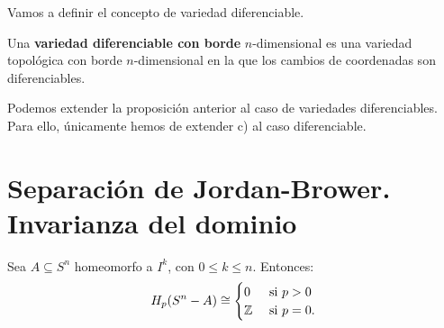 Vamos a definir el concepto de variedad diferenciable.

\begin{definition}
  Una \textbf{variedad diferenciable con borde} $n$-dimensional es una variedad topológica con borde $n$-dimensional en la que
  los cambios de coordenadas son diferenciables.
\end{definition}

\begin{remark}
  Podemos extender la proposición anterior al caso de variedades diferenciables. Para ello, únicamente hemos de extender
  c) al caso diferenciable.
\end{remark}

\section{Separación de Jordan-Brower. Invarianza del dominio}

\begin{proposition}
  Sea $A \subseteq S^n$ homeomorfo a $I^k$, con $0 \leq k \leq n$. Entonces:
  \[ H_p(S^n - A) \cong \begin{cases} 0 &\text{ si } p > 0 \\ \mathbb{Z} &\text{ si } p = 0. \end{cases} \]
\end{proposition}

